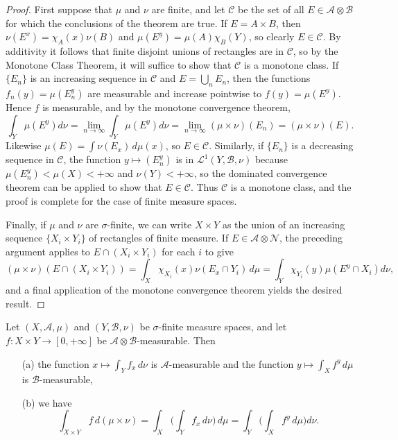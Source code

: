 \begin{proof}
First suppose that $\mu$ and $\nu$ are finite, and let $\mathcal{C}$ be the set of all $E\in\mathcal{A}\otimes\mathcal{B}$ for which the conclusions of the theorem are true. If $E=A\times B$, then $\nu(E^x)=\chi_A(x)\nu(B)$ and $\mu(E^y)=\mu(A)\chi_B(Y)$, so clearly $E\in\mathcal{C}$. By additivity it follows that finite disjoint unions of rectangles are in $\mathcal{C}$, so by the Monotone Class Theorem, it will suffice to show that $\mathcal{C}$ is a monotone class. If $\{E_n\}$ is an increasing sequence in $\mathcal{C}$ and $E=\bigcup_{n}E_n$, then the functions $f_n(y)=\mu(E_n^y)$ are measurable and increase pointwise to $f(y)=\mu(E^y)$. Hence $f$ is measurable, and by the monotone convergence theorem,
\[\int_Y\mu(E^y)d\nu=\lim_{n\to\infty}\int_Y\mu(E^y)d\nu=\lim_{n\to\infty}(\mu\times\nu)(E_n)=(\mu\times\nu)(E).\]
Likewise $\mu(E)=\int\nu(E_x)\,d\mu(x)$, so $E\in\mathcal{C}$. Similarly, if $\{E_n\}$ is a decreasing sequence in $\mathcal{C}$, the function $y\mapsto(E_n^y)$ is in $\mathcal{L}^1(Y,\mathcal{B},\nu)$ because $\mu(E_n^y)<\mu(X)<+\infty$ and $\nu(Y)<+\infty$, so the dominated convergence theorem can be applied to show that $E\in\mathcal{C}$. Thus $\mathcal{C}$ is a monotone class, and the proof is complete for the case of finite measure spaces.\par
Finally, if $\mu$ and $\nu$ are $\sigma$-finite, we can write $X\times Y$ as the union of an increasing sequence $\{X_i\times Y_i\}$ of rectangles of finite measure. If $E\in\mathcal{A}\otimes\mathcal{N}$, the preceding
argument applies to $E\cap(X_i\times Y_i)$ for each $i$ to give
\[(\mu\times\nu)(E\cap(X_i\times Y_i))=\int_X\chi_{X_i}(x)\nu(E_x\cap Y_i)\,d\mu=\int_Y\chi_{Y_i}(y)\mu(E^y\cap X_i)d\nu,\]
and a final application of the monotone convergence theorem yields the desired result.
\end{proof}
\begin{theorem}
Let $(X,\mathcal{A},\mu)$ and $(Y,\mathcal{B},\nu)$ be $\sigma$-finite measure spaces, and let $f:X\times Y\to[0,+\infty]$ be $\mathcal{A}\otimes\mathcal{B}$-measurable. Then
\begin{itemize}
\item[(a)] the function $x\mapsto\int_Yf_x\,d\nu$ is $\mathcal{A}$-measurable and the function $y\mapsto\int_Xf^y\,d\mu$ is $\mathcal{B}$-measurable,
\item[(b)] we have
\[\int_{X\times Y}f\,d(\mu\times\nu)=\int_X\Big(\int_Yf_x\,d\nu\Big)\,d\mu=\int_Y\Big(\int_Xf^y\,d\mu\Big)d\nu.\]
\end{itemize}
\end{theorem}
